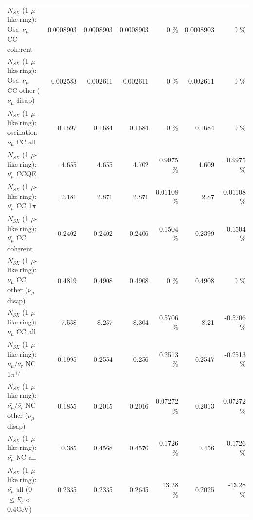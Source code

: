 \begin{table}
\begin{tabular}{| l | r | r | r  r | r  r |}
                        $N_{SK}$ (1 $\mu$-like ring): Osc. $\nu_\mu$ CC coherent &       0.0008903 &       0.0008903 &       0.0008903 &        0 \%  &       0.0008903 &        0 \%  \\ 
         $N_{SK}$ (1 $\mu$-like ring): Osc. $\nu_\mu$ CC other ($\nu_\mu$ disap) &        0.002583 &        0.002611 &        0.002611 &        0 \%  &        0.002611 &        0 \%  \\ 
                      $N_{SK}$ (1 $\mu$-like ring): oscillation $\nu_\mu$ CC all &          0.1597 &          0.1684 &          0.1684 &        0 \%  &          0.1684 &        0 \%  \\ 
\hline
\hline
                              $N_{SK}$ (1 $\mu$-like ring): $\bar{\nu_\mu}$ CCQE &           4.655 &           4.655 &           4.702 &   0.9975 \%  &           4.609 &  -0.9975 \%  \\ 
                         $N_{SK}$ (1 $\mu$-like ring): $\bar{\nu_\mu}$ CC 1$\pi$ &           2.181 &           2.871 &           2.871 &  0.01108 \%  &            2.87 & -0.01108 \%  \\ 
                       $N_{SK}$ (1 $\mu$-like ring): $\bar{\nu_\mu}$ CC coherent &          0.2402 &          0.2402 &          0.2406 &   0.1504 \%  &          0.2399 &  -0.1504 \%  \\ 
        $N_{SK}$ (1 $\mu$-like ring): $\bar{\nu_\mu}$ CC other ($\nu_\mu$ disap) &          0.4819 &          0.4908 &          0.4908 &        0 \%  &          0.4908 &        0 \%  \\ 
                          $N_{SK}$ (1 $\mu$-like ring): $\bar{\nu_{\mu}}$ CC all &           7.558 &           8.257 &           8.304 &   0.5706 \%  &            8.21 &  -0.5706 \%  \\ 
\hline
  $N_{SK}$ (1 $\mu$-like ring): $\bar{\nu_\mu}$/$\bar{\nu_\tau}$ NC 1$\pi^{+/-}$ &          0.1995 &          0.2554 &           0.256 &   0.2513 \%  &          0.2547 &  -0.2513 \%  \\ 
$N_{SK}$ (1 $\mu$-like ring): $\bar{\nu_\mu}$/$\bar{\nu_\tau}$ NC other ($\nu_\mu$ disap) &          0.1855 &          0.2015 &          0.2016 &  0.07272 \%  &          0.2013 & -0.07272 \%  \\ 
                          $N_{SK}$ (1 $\mu$-like ring): $\bar{\nu_{\mu}}$ NC all &           0.385 &          0.4568 &          0.4576 &   0.1726 \%  &           0.456 &  -0.1726 \%  \\ 
\hline
   $N_{SK}$ (1 $\mu$-like ring): $\bar{\nu_{\mu}}$ all (0 $\leq E_{t} <$ 0.4GeV) &          0.2335 &          0.2335 &          0.2645 &    13.28 \%  &          0.2025 &   -13.28 \%  \\ 

\end{tabular}
\end{table}
